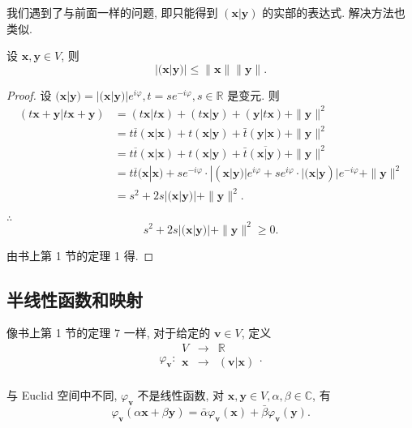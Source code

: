 \documentclass{ctexart}
\begin{document}
我们遇到了与前面一样的问题, 即只能得到 $(\boldsymbol{x}|\boldsymbol{y})$ 的实部的表达式. 解决方法也类似.
\begin{theorem}
    设 $\boldsymbol{x},\boldsymbol{y}\in V$, 则
    \[|(\boldsymbol{x}|\boldsymbol{y})|\leq\|\boldsymbol{x}\|\|\boldsymbol{y}\|.\]
\end{theorem}
\begin{proof}
    设 $(\boldsymbol{x}|\boldsymbol{y})=|(\boldsymbol{x}|\boldsymbol{y})|e^{i\varphi},t=se^{-i\varphi},s\in\mathbb{R}$ 是变元. 则 
    \begin{align*}
        (t\boldsymbol{x}+\boldsymbol{y}|t\boldsymbol{x}+\boldsymbol{y}) & =(t\boldsymbol{x}|t\boldsymbol{x})+(t\boldsymbol{x}|\boldsymbol{y})+(\boldsymbol{y}|t\boldsymbol{x})+\|\boldsymbol{y}\|^2 \\
        & =t\overline{t}(\boldsymbol{x}|\boldsymbol{x})+t(\boldsymbol{x}|\boldsymbol{y})+\bar{t}(\boldsymbol{y}|\boldsymbol{x})+\|\boldsymbol{y}\|^2 \\
        & =t\overline{t}(\boldsymbol{x}|\boldsymbol{x})+t(\boldsymbol{x}|\boldsymbol{y})+\bar{t}\overline{(\boldsymbol{x}|\boldsymbol{y})}+\|\boldsymbol{y}\|^2 \\
        & =t\overline{t}(\boldsymbol{x}|\boldsymbol{x})+se^{-i\varphi}\cdot|(\boldsymbol{x}|\boldsymbol{y})|e^{i\varphi}+se^{i\varphi}\cdot|(\boldsymbol{x}|\boldsymbol{y})|e^{-i\varphi}+\|\boldsymbol{y}\|^2 \\
        & =s^2+2s|(\boldsymbol{x}|\boldsymbol{y})|+\|\boldsymbol{y}\|^2.
    \end{align*}

    $\therefore$
    \[s^2+2s|(\boldsymbol{x}|\boldsymbol{y})|+\|\boldsymbol{y}\|^2\geq0.\]

    由书上第 1 节的定理 1 得.
\end{proof}
\subsection{半线性函数和映射}
像书上第 1 节的定理 7 一样, 对于给定的 $\boldsymbol{v}\in V$, 定义
\[\varphi_{\boldsymbol{v}}:\begin{array}{rcl}
    V & \to & \mathbb{R} \\
    \boldsymbol{x} & \to & (\boldsymbol{v}|\boldsymbol{x}) \\
\end{array}.\]

与 Euclid 空间中不同, $\varphi_{\boldsymbol{v}}$ 不是线性函数, 对 $\boldsymbol{x},\boldsymbol{y}\in V,\alpha,\beta\in\mathbb{C}$, 有
\[\varphi_{\boldsymbol{v}}(\alpha\boldsymbol{x}+\beta\boldsymbol{y})=\bar{\alpha}\varphi_{\boldsymbol{v}}(\boldsymbol{x})+\bar{\beta}\varphi_{\boldsymbol{v}}(\boldsymbol{y}).\]
\end{document}
